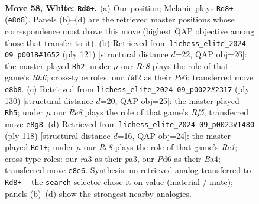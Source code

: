 \documentclass[11pt]{article}
\begin{document}
\clearpage

\begin{figure}[p]\centering
\begin{subfigure}{0.46\textwidth}\centering
\resizebox{\linewidth}{!}{%
\newchessgame
\chessboard[
  setfen={4R3/3k3r/3P4/1p6/4K3/r7/1p1B4/8 w - - 4 58},
  showmover=false,
  pgfstyle=straightmove, color=movearrow, markmove={e8-d8}
]}
\caption{}
\end{subfigure}\hfill
\begin{subfigure}{0.46\textwidth}\centering
\resizebox{\linewidth}{!}{%
\newchessgame
\chessboard[
  setfen={6R1/8/4pk2/8/5pK1/7r/5P2/8 b - - 1 61},
  showmover=false,
  pgfstyle=straightmove, color=movearrow, markmove={h3-h2}
]}
\caption{}
\end{subfigure}
\\[4pt]
\begin{subfigure}{0.46\textwidth}\centering
\resizebox{\linewidth}{!}{%
\newchessgame
\chessboard[
  setfen={8/2K5/4k1r1/2B1PR2/8/8/8/8 w - - 1 66},
  showmover=false,
  pgfstyle=straightmove, color=movearrow, markmove={f5-h5}
]}
\caption{}
\end{subfigure}\hfill
\begin{subfigure}{0.46\textwidth}\centering
\resizebox{\linewidth}{!}{%
\newchessgame
\chessboard[
  setfen={8/8/3p4/n2P3P/B7/p7/3k3r/K1R5 w - - 12 60},
  showmover=false,
  pgfstyle=straightmove, color=movearrow, markmove={c1-d1}
]}
\caption{}
\end{subfigure}
\caption{\textbf{Move 58, White: \texttt{Rd8+}.} (a) Our position; Melanie plays \texttt{Rd8+} (\texttt{e8d8}). Panels (b)--(d) are the retrieved master positions whose correspondence most drove this move (highest QAP objective among those that transfer to it). (b) Retrieved from \texttt{lichess\_elite\_2024-09\_p0018\#1652} (ply 121) [structural distance $d$=22, QAP obj=26]: the master played \texttt{Rh2}; under $\mu$ our \emph{Re8} plays the role of that game's \emph{Rh6}; cross-type roles: our \emph{B}d2 as their \emph{P}e6; transferred move \texttt{e8b8}. (c) Retrieved from \texttt{lichess\_elite\_2024-09\_p0022\#2317} (ply 130) [structural distance $d$=20, QAP obj=25]: the master played \texttt{Rh5}; under $\mu$ our \emph{Re8} plays the role of that game's \emph{Rf5}; transferred move \texttt{e8g8}. (d) Retrieved from \texttt{lichess\_elite\_2024-09\_p0023\#1480} (ply 118) [structural distance $d$=16, QAP obj=24]: the master played \texttt{Rd1+}; under $\mu$ our \emph{Re8} plays the role of that game's \emph{Rc1}; cross-type roles: our \emph{r}a3 as their \emph{p}a3, our \emph{P}d6 as their \emph{B}a4; transferred move \texttt{e8e6}. Synthesis: no retrieved analog transferred to \texttt{Rd8+} -- the \texttt{search} selector chose it on value (material / mate); panels (b)--(d) show the strongest nearby analogies.}
\label{fig:thought-m114}
\end{figure}
\end{document}
